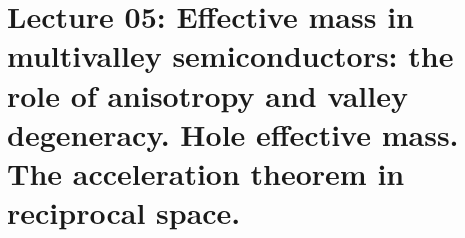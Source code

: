 \chapter{Lecture 05: Effective mass in multivalley semiconductors: the role of anisotropy and valley degeneracy. Hole effective mass. The acceleration theorem in reciprocal space.}
















